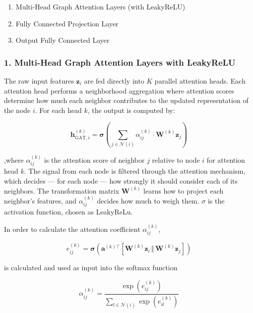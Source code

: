 \documentclass[journal]{IEEEtran}  %
\begin{document}
\begin{enumerate}
    \item Multi-Head Graph Attention Layers (with LeakyReLU)
    \item Fully Connected Projection Layer
    \item Output Fully Connected Layer
\end{enumerate}

\subsubsection*{1. Multi-Head Graph Attention Layers with LeakyReLU}

The raw input features $\mathbf{z}_i$ are fed directly into $K$ parallel attention heads. Each attention head performs a neighborhood aggregation where attention scores determine how much each neighbor contributes to the updated representation of the node $i$. For each head $k$, the output is computed by:

\begin{equation}
\label{eq:k-th attention head}
\mathbf{h}_{\text{GAT}, i}^{(k)} =  \mathbf{\sigma} \left( \sum_{j \in \mathcal{N}(i)} \alpha_{ij}^{(k)} \cdot \mathbf{W}^{(k)} \mathbf{z}_j \right)
\end{equation}

,where $\alpha_{ij}^{(k)}$ is the attention score of neighbor $j$ relative to node $i$ for attention head $k$. The signal from each node is filtered through the attention mechanism, which decides — for each node — how strongly it should consider each of its neighbors. The transformation matrix $\mathbf{W}^{(k)}$ learns how to project each neighbor's features, and $\alpha_{ij}^{(k)}$ decides how much to weigh them. $\sigma$ is the activation function, chosen as LeakyReLu.


In order to calculate the attention coefficient $\alpha_{ij}^{(k)}$,

\begin{equation}
\label{eq:attention_coefficients_1}
e_{ij}^{(k)} = \mathbf{\sigma} \left( \mathbf{a}^{(k)\top} \left[ \mathbf{W}^{(k)} \mathbf{z}_i \, \Vert \, \mathbf{W}^{(k)} \mathbf{z}_j \right] \right)
\end{equation}

is calculated and used as input into the softmax function

\begin{equation}
\label{eq:attention_coefficients_2}
  \alpha_{ij}^{(k)} = \frac{\exp(e_{ij}^{(k)})}{\sum_{l \in \mathcal{N}(i)} \exp(e_{il}^{(k)})}
\end{equation}
\end{document}
